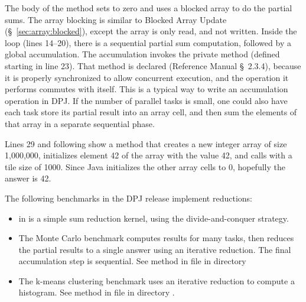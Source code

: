 The body of the  method sets  to zero and uses a
blocked array to do the partial sums.  The array blocking is similar
to Blocked Array Update (\S~\ref{sec:array:blocked}), except the array
is only read, and not written.  Inside the  loop (lines
14--20), there is a sequential partial sum computation, followed by a
global accumulation.  The accumulation invokes the private method
 (defined starting in line 23).  That method is
declared  (Reference Manual \S~2.3.4), because it is
properly synchronized to allow concurrent execution, and the operation
it performs commutes with itself.  This is a typical way to write an
accumulation operation in DPJ.  If the number of parallel tasks is
small, one could also have each task store its partial result into an
array cell, and then sum the elements of that array in a separate
sequential phase.

Lines 29 and following show a  method that creates a new
integer array of size 1,000,000, initializes element 42 of the array
with the value 42, and calls  with a tile size of 1000.
Since Java initializes the other array cells to 0, hopefully the
answer is 42.

 The following benchmarks in the DPJ release
implement reductions:
%
\begin{itemize}
%
\item {} in  is a simple
  sum reduction kernel, using the divide-and-conquer strategy.
%
\item The Monte Carlo benchmark computes results for many tasks, then
  reduces the partial results to a single answer using an iterative
  reduction.  The final accumulation step is sequential.  See method
   in file  in directory
%
\item The k-means clustering benchmark uses an iterative reduction to
  compute a histogram.  See method  in file
   in directory
  .
%
\end{itemize}
